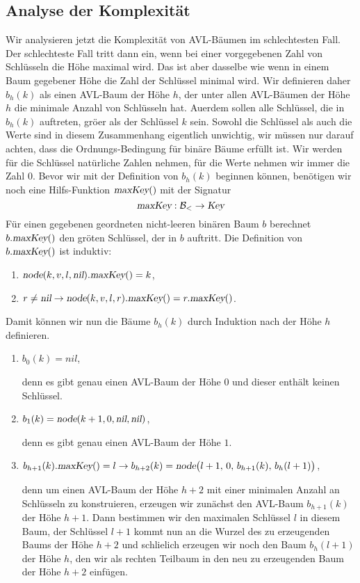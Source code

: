 \subsection{Analyse der Komplexit\"at}
Wir analysieren jetzt die Komplexit\"at von AVL-B\"aumen im schlechtesten Fall. Der
schlechteste Fall tritt dann ein, wenn bei einer vorgegebenen Zahl von Schl\"usseln die H\"ohe
maximal wird.  Das ist aber dasselbe wie wenn in einem Baum gegebener H\"ohe die Zahl der
Schl\"ussel minimal wird.  Wir definieren daher $b_h(k)$ als einen AVL-Baum der H\"ohe $h$, der
unter allen AVL-B\"aumen der H\"ohe $h$ die minimale Anzahl von Schl\"usseln hat.  Au\3erdem
sollen alle Schl\"ussel, die in $b_h(k)$ auftreten, gr\"o\3er als der Schl\"ussel $k$ sein.
Sowohl die Schl\"ussel als auch die Werte sind in diesem Zusammenhang eigentlich unwichtig,
wir m\"ussen nur darauf achten, dass die Ordnungs-Bedingung f\"ur bin\"are B\"aume erf\"ullt ist.
Wir werden f\"ur die Schl\"ussel nat\"urliche Zahlen nehmen, f\"ur die Werte nehmen wir immer die
Zahl $0$.  Bevor wir mit der Definition von $b_h(k)$ beginnen k\"onnen, ben\"otigen wir noch eine
Hilfs-Funktion $\textsl{maxKey}()$ mit der Signatur  
\[ \textsl{maxKey}:\mathcal{B}_< \rightarrow \textsl{Key} \]
F\"ur einen gegebenen geordneten nicht-leeren bin\"aren Baum $b$ 
berechnet $b.\textsl{maxKey}()$ den gr\"o\3ten Schl\"ussel, der in $b$ auftritt.  Die
Definition von $b.\textsl{maxKey}()$ ist induktiv:
\begin{enumerate}
\item $\textsl{node}(k,v,l,\textsl{nil}).\textsl{maxKey}() = k$,
\item $r \not= \textsl{nil} \rightarrow \textsl{node}(k,v,l,r).\textsl{maxKey}() = r.\textsl{maxKey}()$.
\end{enumerate}
Damit k\"onnen wir nun die B\"aume $b_h(k)$ durch Induktion nach der H\"ohe $h$ definieren.
\begin{enumerate}
\item $b_0(k) = nil$,

      denn es gibt genau einen AVL-Baum der H\"ohe $0$ und dieser enth\"alt keinen Schl\"ussel.
\item $b_1(k) = \textsl{node}(k+1,0,\textsl{nil}, \textsl{nil})$,

      denn es gibt genau einen AVL-Baum der H\"ohe $1$.
\item $b_{h+1}(k).\textsl{maxKey}() = l \rightarrow 
       b_{h+2}(k) = \textsl{node}\bigl(l+1,\,0,\,b_{h+1}(k),\,b_h(l+1)\bigr)$,

      denn um einen AVL-Baum der H\"ohe $h+2$ mit einer minimalen Anzahl an Schl\"usseln zu
      konstruieren, erzeugen wir zun\"achst den AVL-Baum $b_{h+1}(k)$ der H\"ohe $h+1$.
      Dann bestimmen wir den maximalen Schl\"ussel $l$ in diesem Baum, der Schl\"ussel $l+1$
      kommt nun an die Wurzel des zu erzeugenden Baums der H\"ohe $h+2$ und schlie\3lich erzeugen wir noch
      den Baum $b_h(l+1)$ der H\"ohe $h$, den wir als rechten Teilbaum in den neu zu
      erzeugenden Baum der H\"ohe $h+2$  einf\"ugen.
\end{enumerate}
